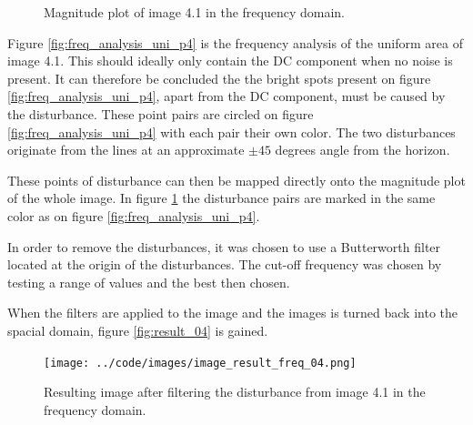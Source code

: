 \begin{figure}[H]
\centering
{}

\caption{Magnitude plot of image 4.1 in the frequency domain.}
\label{fig:freq_analysis_p4}
\end{figure}


Figure \ref{fig:freq_analysis_uni_p4} is the frequency analysis of the uniform area of image 4.1.
This should ideally only contain the DC component when no noise is present.
It can therefore be concluded the the bright spots present on figure \ref{fig:freq_analysis_uni_p4}, apart from the DC component, must be caused by the disturbance.
These point pairs are circled on figure \ref{fig:freq_analysis_uni_p4} with each pair their own color.
The two disturbances originate from the lines at an approximate $\pm 45$ degrees angle from the horizon.

These points of disturbance can then be mapped directly onto the magnitude plot of the whole image.
In figure \ref{fig:freq_analysis_p4} the disturbance pairs are marked in the same color as on figure  \ref{fig:freq_analysis_uni_p4}.


In order to remove the disturbances, it was chosen to use a Butterworth filter located at the origin of the disturbances.
The cut-off frequency was chosen by testing a range of values and the best then chosen.

When the filters are applied to the image and the images is turned back into the spacial domain, figure \ref{fig:result_04} is gained.


\begin{figure}[H]
\centering
\texttt{[image: ../code/images/image\_result\_freq\_04.png]}
\caption{Resulting image after filtering the disturbance from image 4.1 in the frequency domain.}
\label{fig:result_freq_04}
\end{figure}

